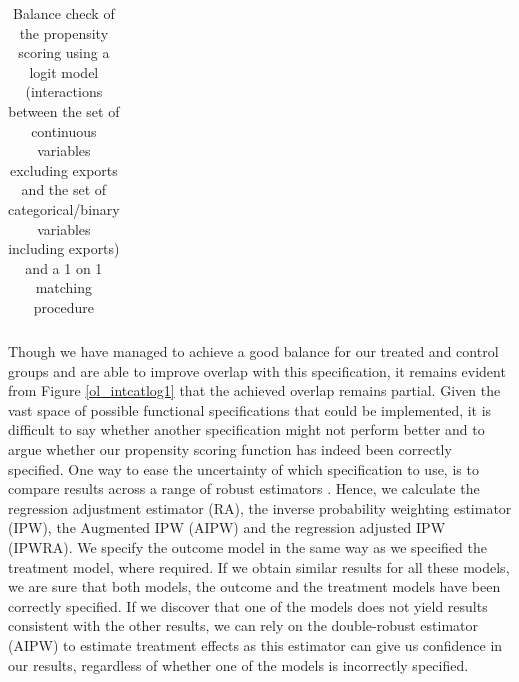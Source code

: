 \begin{table}
	\centering
	\begin{tabular}{lcccc}
		\hline \hline
	
	\hline \hline
	\end{tabular}
	\caption{Balance check of the propensity scoring using a logit model (interactions between the set of continuous variables excluding exports and the set of categorical/binary variables including exports) and a 1 on 1 matching procedure}
	\label{bal_intcatlog1}
\end{table}

Though we have managed to achieve a good balance for our treated and control groups and are able to improve overlap with this specification, it remains evident from Figure \ref{ol_intcatlog1} that the achieved overlap remains partial. Given the vast space of possible functional specifications that could be implemented, it is difficult to say whether another specification might not perform better and to argue whether our propensity scoring function has indeed been correctly specified. One way to ease the uncertainty of which specification to use, is to compare results across a range of robust estimators \citep{wooldridge2010econometric, robins1995semiparametric}. Hence, we calculate the regression adjustment estimator (RA), the inverse probability weighting estimator (IPW), the Augmented IPW (AIPW) and the regression adjusted IPW (IPWRA). We specify the outcome model in the same way as we specified the treatment model, where required. If we obtain similar results for all these models, we are sure that both models, the outcome and the treatment models have been correctly specified. If we discover that one of the models does not yield results consistent with the other results, we can rely on the double-robust estimator (AIPW) to estimate treatment effects as this estimator can give us confidence in our results, regardless of whether one of the models is incorrectly specified. 
\\ \par

